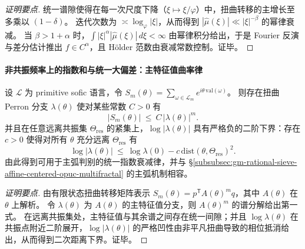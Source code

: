 \begin{proof}[证明要点]
统一谱隙使得在每一次尺度下降（\(\xi\mapsto \xi/\varphi\)）中，扭曲转移的主增长至多乘以 \((1-\delta)\)。
迭代次数为 \(\asymp \log_\varphi|\xi|\)，从而得到
\(
|\widehat\mu(\xi)|\ll |\xi|^{-\beta}
\)
的幂律衰减。
当 \(\beta>1+\alpha\) 时，\(\int |\xi|^{\alpha}|\widehat\mu(\xi)|\,d\xi<\infty\) 由幂律积分给出，于是 Fourier 反演与差分估计推出 \(f\in C^\alpha\)，且 Hölder 范数由衰减常数控制。证毕。
\end{proof}

\paragraph{非共振频率上的指数和与统一大偏差：主特征值曲率律}
\begin{proposition}\label{prop:gm-nonresonant-exp-sum-curvature}
设 \(\mathcal{L}\) 为 primitive sofic 语言，令
\(
S_m(\theta)=\sum_{\omega\in\mathcal{L}_m} e^{i\theta\,\mathrm{val}(\omega)}
\)。
则存在扭曲 Perron 分支 \(\lambda(\theta)\) 使对某些常数 \(C>0\) 有
\[
|S_m(\theta)|\ \le\ C\,|\lambda(\theta)|^{m}.
\]
并且在任意远离共振集 \(\Theta_{\mathrm{res}}\) 的紧集上，\(\log|\lambda(\theta)|\) 具有严格负的二阶下界：存在 \(c>0\) 使得对所有 \(\theta\) 充分远离 \(\Theta_{\mathrm{res}}\) 有
\[
\log|\lambda(\theta)|\ \le\ \log\lambda(0)-c\,\mathrm{dist}(\theta,\Theta_{\mathrm{res}})^2.
\]
由此得到可用于主弧判别的统一指数衰减律，并与 \S\ref{subsubsec:gm-rational-sieve-affine-centered-opuc-multifractal} 的主弧机制相容。
\end{proposition}

\begin{proof}[证明要点]
由有限状态扭曲转移矩阵表示 \(S_m(\theta)=p^{\mathsf T}A(\theta)^{m}q\)，其中 \(A(\theta)\) 在 \(\theta\) 上解析。
令 \(\lambda(\theta)\) 为 \(A(\theta)\) 的主特征值分支，则 \(A(\theta)^m\) 的谱分解给出第一式。
在远离共振集处，主特征值与其余谱之间存在统一间隙；并且 \(\log\lambda(\theta)\) 在共振点附近二阶展开，\(\log|\lambda(\theta)|\) 的严格凹性由非平凡扭曲导致的相位抵消给出，从而得到二次距离下界。证毕。
\end{proof}

